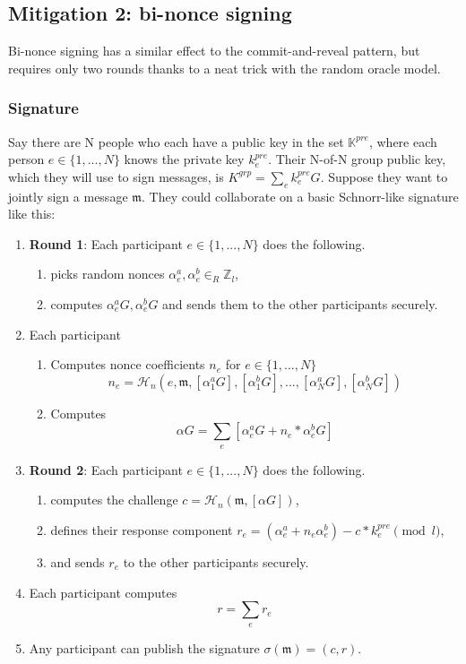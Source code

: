 \subsection*{Mitigation 2: bi-nonce signing}

Bi-nonce signing has a similar effect to the commit-and-reveal pattern, but requires only two rounds thanks to a neat trick with the random oracle model.

\subsubsection*{Signature}

Say there are N people who each have a public key in the set $\mathbb{K}^{pre}$, where each person $e \in \{1,...,N\}$ knows the private key $k^{pre}_e$. Their N-of-N group public key, which they will use to sign messages, is $K^{grp} = \sum_e k^{pre}_e G$. Suppose they want to jointly sign a message $\mathfrak{m}$. They could collaborate on a basic Schnorr-like signature like this:

\begin{enumerate}
    \item \textbf{Round 1}: Each participant $e \in \{1,...,N\}$ does the following.
    \begin{enumerate}
        \item picks random nonces $\alpha^a_e, \alpha^b_e \in_R \mathbb{Z}_l$,
        \item computes $\alpha^a_e G, \alpha^b_e G$ and sends them to the other participants securely.
    \end{enumerate}

    \item Each participant
    \begin{enumerate}
        \item Computes nonce coefficients $n_e$ for $e \in \{1,...,N\}$\vspace{.115cm}
        \[ n_e = \mathcal{H}_n(e, \mathfrak{m}, [\alpha^a_1 G], [\alpha^b_1 G], ..., [\alpha^a_N G], [\alpha^b_N G]) \]

        \item Computes
        \[ \alpha G = \sum_e [\alpha^a_e G + n_e*\alpha^b_e G] \]
    \end{enumerate}

    \item \textbf{Round 2}: Each participant $e \in \{1,...,N\}$ does the following.
    \begin{enumerate}
        \item computes the challenge $c = \mathcal{H}_n(\mathfrak{m},[\alpha G])$,
        \item defines their response component $r_e = (\alpha^a_e + n_e \alpha^b_e) - c*k^{pre}_e \pmod l$,
        \item and sends $r_e$ to the other participants securely.
    \end{enumerate}

    \item Each participant computes 
    \[ r = \sum_e r_e\]
    \item Any participant can publish the signature $\sigma(\mathfrak{m}) = (c, r)$.
\end{enumerate}

